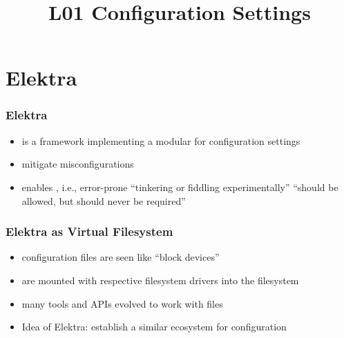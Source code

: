 


\title{L01 Configuration Settings}
\date{}


\section{Elektra}
\begin{frame}
	\frametitle{Elektra~\cite{raab2016elektra}}
	\begin{itemize}[<+->]
		\item \elektra{} is a framework implementing a modular  for configuration settings
		\item {} mitigate misconfigurations
		\item \elektra{} enables  \cite{holland2001nofutz},
			i.e., error-prone \enquote{tinkering or fiddling experimentally} \enquote{should be allowed, but should never be required}
	\end{itemize}
\end{frame}

\begin{frame}
	\frametitle{Elektra as Virtual Filesystem}
	\begin{itemize}
	\item configuration files are seen like ``block devices''
	\item are mounted with respective filesystem drivers into the filesystem
	\item many tools and APIs evolved to work with files
	\item Idea of Elektra: establish a similar ecosystem for configuration
	\end{itemize}
\end{frame}

